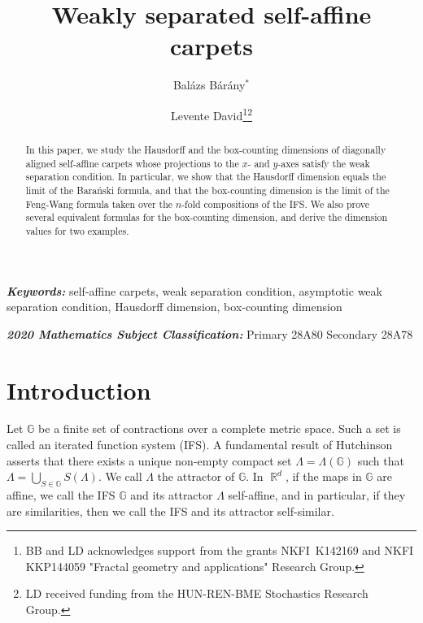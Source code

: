 \documentclass[a4paper, 11pt]{article}
\date{}
\providecommand{\keywords}[1]
{
	\small	
	\textbf{\textit{Keywords:}} #1
}
\providecommand{\subjclass}[1]
{
	\small	
	\textbf{\textit{2020 Mathematics Subject Classification:}} #1
}
\DeclareMathOperator{\R}{\mathbb{R}}
\numberwithin{equation}{section}
\theoremstyle{plain}
\theoremstyle{remark}
\theoremstyle{definition}
\begin{document}
	
	\title{Weakly separated self-affine carpets}
	\author[1]{Bal\'azs B\'ar\'any$^*$}
	\author[1]{Levente David\thanks{BB and LD acknowledges support from the grants NKFI~K142169 and NKFI KKP144059 "Fractal geometry and applications" Research Group.}\thanks{LD received funding from the HUN-REN-BME Stochastics Research Group.}}
	
	\maketitle

\begin{abstract}
In this paper, we study the Hausdorff and the box-counting dimensions of diagonally aligned self-affine carpets whose projections to the $x$- and $y$-axes satisfy the weak separation condition. In particular, we show that the Hausdorff dimension equals the limit of the Bara\'nski formula, and that the box-counting dimension is the limit of the Feng-Wang formula taken over the $n$-fold compositions of the IFS. We also prove several equivalent formulas for the box-counting dimension, and derive the dimension values for two examples.
\end{abstract}

\keywords{self-affine carpets, weak separation condition, asymptotic weak separation condition, Hausdorff dimension, box-counting dimension}

\subjclass{Primary 28A80 Secondary 28A78}

\section{Introduction}

Let $\mathbb{G}$ be a finite set of contractions over a complete metric space. Such a set is called an iterated function system (IFS). A fundamental result of Hutchinson \cite{Hutchinson1981} asserts that there exists a unique non-empty compact set $\Lambda = \Lambda(\mathbb{G})$ such that $\Lambda=\bigcup_{S\in\mathbb{G}}S(\Lambda)$. We call $\Lambda$ the attractor of $\mathbb{G}$. In $\R^d$, if the maps in $\mathbb{G}$ are affine, we call the IFS $\mathbb{G}$ and its attractor $\Lambda$ self-affine, and in particular, if they are similarities, then we call the IFS and its attractor self-similar.
\end{document}
